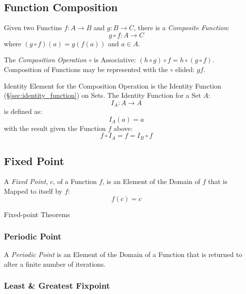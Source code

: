 \subsection{Function Composition}\label{sec:function_composition}

Given two Functins $f : A \rightarrow B$ and $g : B \rightarrow C$,
there is a \emph{Composite Function}:
\[
  g \circ f : A \rightarrow C
\]
where $(g \circ f)(a) = g(f(a))$ and $a \in A$.

The \emph{Composition Operation} $\circ$ is Associative: $(h \circ g)
\circ f = h \circ (g \circ f)$. Composition of Functions may be
represented with the $\circ$ elided: $gf$.

Identity Element for the Composition Operation is the Identity
Function (\S\ref{sec:identity_function}) on Sets. The Identity
Function for a Set $A$:
\[
  I_A : A \rightarrow A
\]
is defined as:
\[
  I_A(a) = a
\]
with the result given the Function $f$ above:
\[
  f \circ I_A = f = I_B \circ f
\]



\subsection{Fixed Point}\label{sec:fixed_point}

A \emph{Fixed Point}, $c$, of a Function $f$, is an Element of the
Domain of $f$ that is Mapped to itself by $f$:
\[
  f(c) = c
\]

Fixed-point Theorems



\subsubsection{Periodic Point}\label{sec:periodic_point}

A \emph{Periodic Point} is an Element of the Domain of a Function that
is returned to after a finite number of iterations.



\subsubsection{Least \& Greatest Fixpoint}
\label{sec:leastgreatest_fixpoint}



